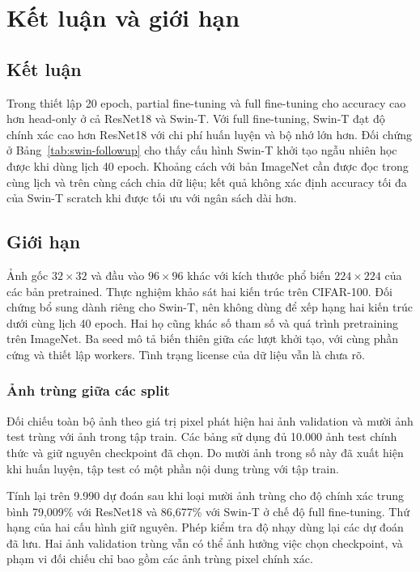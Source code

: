 \documentclass[12pt,a4paper]{report}
\begin{document}
\chapter{Kết luận và giới hạn}
\section{Kết luận}
Trong thiết lập 20 epoch, partial fine-tuning và full fine-tuning cho accuracy cao hơn head-only ở cả ResNet18 và Swin-T. Với full fine-tuning, Swin-T đạt độ chính xác cao hơn ResNet18 với chi phí huấn luyện và bộ nhớ lớn hơn. Đối chứng ở Bảng~\ref{tab:swin-followup} cho thấy cấu hình Swin-T khởi tạo ngẫu nhiên học được khi dùng lịch 40 epoch. Khoảng cách với bản ImageNet cần được đọc trong cùng lịch và trên cùng cách chia dữ liệu; kết quả không xác định accuracy tối đa của Swin-T scratch khi được tối ưu với ngân sách dài hơn.

\section{Giới hạn}
Ảnh gốc $32\times32$ và đầu vào $96\times96$ khác với kích thước phổ biến
$224\times224$ của các bản pretrained. Thực nghiệm khảo sát hai kiến
trúc trên CIFAR-100. Đối chứng bổ sung dành riêng cho Swin-T, nên không dùng để
xếp hạng hai kiến trúc dưới cùng lịch 40 epoch. Hai họ cũng khác số tham số
và quá trình pretraining trên ImageNet.
Ba seed mô tả biến thiên giữa các lượt khởi tạo, với cùng phần cứng và
thiết lập workers. Tình trạng license của dữ liệu vẫn là chưa rõ.

\subsection{Ảnh trùng giữa các split}
Đối chiếu toàn bộ ảnh theo giá trị pixel phát hiện hai ảnh validation và mười ảnh test trùng với ảnh trong tập train. Các bảng sử dụng đủ 10.000 ảnh test chính thức và giữ nguyên checkpoint đã chọn. Do mười ảnh trong số này đã xuất hiện khi huấn luyện, tập test có một phần nội dung trùng với tập train.

Tính lại trên 9.990 dự đoán sau khi loại mười ảnh trùng cho độ chính xác trung bình 79,009\% với ResNet18 và 86,677\% với Swin-T ở chế độ full fine-tuning. Thứ hạng của hai cấu hình giữ nguyên. Phép kiểm tra độ nhạy dùng lại các dự đoán đã lưu. Hai ảnh validation trùng vẫn có thể ảnh hưởng việc chọn checkpoint, và phạm vi đối chiếu chỉ bao gồm các ảnh trùng pixel chính xác.
\end{document}
